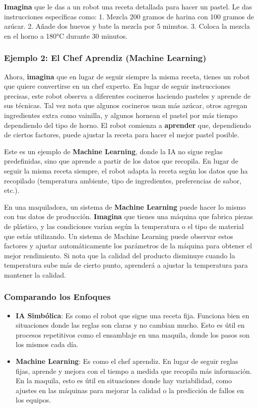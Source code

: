 \documentclass[
  10pt,
  letterpaper,
]{book}
\begin{document}
\textbf{Imagina} que le das a un robot una receta detallada para hacer
un pastel. Le das instrucciones específicas como: 1. Mezcla 200 gramos
de harina con 100 gramos de azúcar. 2. Añade dos huevos y bate la mezcla
por 5 minutos. 3. Coloca la mezcla en el horno a 180°C durante 30
minutos.

\subsubsection{Ejemplo 2: El Chef Aprendiz (Machine
Learning)}\label{ejemplo-2-el-chef-aprendiz-machine-learning}

Ahora, \textbf{imagina} que en lugar de seguir siempre la misma receta,
tienes un robot que quiere convertirse en un chef experto. En lugar de
seguir instrucciones precisas, este robot observa a diferentes cocineros
haciendo pasteles y aprende de sus técnicas. Tal vez nota que algunos
cocineros usan más azúcar, otros agregan ingredientes extra como
vainilla, y algunos hornean el pastel por más tiempo dependiendo del
tipo de horno. El robot comienza a \textbf{aprender} que, dependiendo de
ciertos factores, puede ajustar la receta para hacer el mejor pastel
posible.

Este es un ejemplo de \textbf{Machine Learning}, donde la IA no sigue
reglas predefinidas, sino que aprende a partir de los datos que
recopila. En lugar de seguir la misma receta siempre, el robot adapta la
receta según los datos que ha recopilado (temperatura ambiente, tipo de
ingredientes, preferencias de sabor, etc.).

En una maquiladora, un sistema de \textbf{Machine Learning} puede hacer
lo mismo con tus datos de producción. \textbf{Imagina} que tienes una
máquina que fabrica piezas de plástico, y las condiciones varían según
la temperatura o el tipo de material que estás utilizando. Un sistema de
Machine Learning puede observar estos factores y ajustar automáticamente
los parámetros de la máquina para obtener el mejor rendimiento. Si nota
que la calidad del producto disminuye cuando la temperatura sube más de
cierto punto, aprenderá a ajustar la temperatura para mantener la
calidad.

\subsubsection{Comparando los Enfoques}\label{comparando-los-enfoques}

\begin{itemize}
\item
  \textbf{IA Simbólica}: Es como el robot que sigue una receta fija.
  Funciona bien en situaciones donde las reglas son claras y no cambian
  mucho. Esto es útil en procesos repetitivos como el ensamblaje en una
  maquila, donde los pasos son los mismos cada día.
\item
  \textbf{Machine Learning}: Es como el chef aprendiz. En lugar de
  seguir reglas fijas, aprende y mejora con el tiempo a medida que
  recopila más información. En la maquila, esto es útil en situaciones
  donde hay variabilidad, como ajustes en las máquinas para mejorar la
  calidad o la predicción de fallos en los equipos.
\end{itemize}
\end{document}
